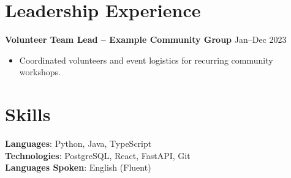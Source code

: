 \documentclass[a4paper,10pt]{article}
\begin{document}
\begin{small}
\section*{Leadership Experience}
\textbf{Volunteer Team Lead -- Example Community Group} \hfill Jan--Dec 2023
\begin{itemize}[leftmargin=*]
\item Coordinated volunteers and event logistics for recurring community workshops.
\end{itemize}

\section*{Skills}

\textbf{Languages}: Python, Java, TypeScript \\
\textbf{Technologies}: PostgreSQL, React, FastAPI, Git \\
\textbf{Languages Spoken}: English (Fluent)

\end{small}
\end{document}

